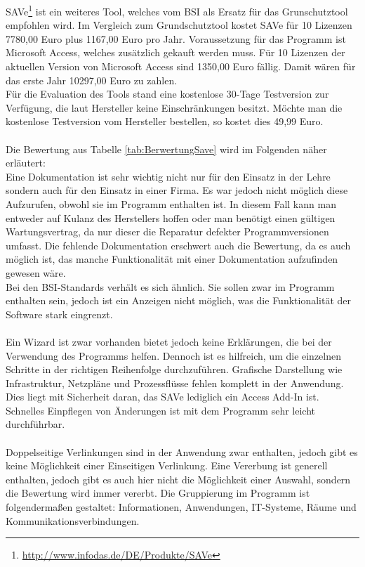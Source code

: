 SAVe\footnote{\url{http://www.infodas.de/DE/Produkte/SAVe}} ist ein weiteres Tool, welches vom BSI als Ersatz für das Grunschutztool empfohlen wird. Im Vergleich zum Grundschutztool kostet SAVe für 10 Lizenzen 7780,00 Euro plus 1167,00 Euro pro Jahr. Voraussetzung für das Programm ist Microsoft Access, welches zusätzlich gekauft werden muss. Für 10 Lizenzen der aktuellen Version von Microsoft Access sind 1350,00 Euro fällig. Damit wären für das erste Jahr 10297,00 Euro zu zahlen.\\
Für die Evaluation des Tools stand eine kostenlose 30-Tage Testversion zur Verfügung, die laut Hersteller keine Einschränkungen besitzt. Möchte man die kostenlose Testversion vom Hersteller bestellen, so kostet dies 49,99 Euro.\\
\\
Die Bewertung aus Tabelle \ref{tab:BerwertungSave} wird im Folgenden näher erläutert:\\
Eine Dokumentation ist sehr wichtig nicht nur für den Einsatz in der Lehre sondern auch für den Einsatz in einer Firma. Es war jedoch nicht möglich diese Aufzurufen, obwohl sie im Programm enthalten ist. In diesem Fall kann man entweder auf Kulanz des Herstellers hoffen oder man benötigt einen gültigen Wartungsvertrag, da nur dieser die Reparatur defekter Programmversionen umfasst. Die fehlende Dokumentation erschwert auch die Bewertung, da es auch möglich ist, das manche Funktionalität mit einer Dokumentation aufzufinden gewesen wäre.\\
Bei den BSI-Standards verhält es sich ähnlich. Sie sollen zwar im Programm enthalten sein, jedoch ist ein Anzeigen nicht möglich, was die Funktionalität der Software stark eingrenzt.\\
\\
Ein Wizard ist zwar vorhanden bietet jedoch keine Erklärungen, die bei der Verwendung des Programms helfen. Dennoch ist es hilfreich, um die einzelnen Schritte in der richtigen Reihenfolge durchzuführen. Grafische Darstellung wie Infrastruktur, Netzpläne und Prozessflüsse fehlen komplett in der Anwendung. Dies liegt mit Sicherheit daran, das SAVe lediglich ein Access Add-In ist. Schnelles Einpflegen von Änderungen ist mit dem Programm sehr leicht durchführbar.\\
\\
Doppelseitige Verlinkungen sind in der Anwendung zwar enthalten, jedoch gibt es keine Möglichkeit einer Einseitigen Verlinkung. Eine Vererbung ist generell enthalten, jedoch gibt es auch hier nicht die Möglichkeit einer Auswahl, sondern die Bewertung wird immer vererbt. Die Gruppierung im Programm ist folgendermaßen gestaltet: Informationen, Anwendungen, IT-Systeme, Räume und Kommunikationsverbindungen.\\
